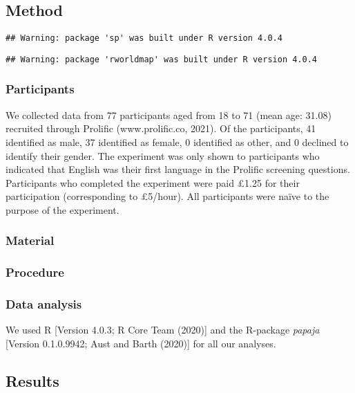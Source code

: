 \documentclass[
  english,
  man]{apa6}
\begin{document}
\hypertarget{method}{%
\subsection{Method}\label{method}}

\begin{verbatim}
## Warning: package 'sp' was built under R version 4.0.4
\end{verbatim}

\begin{verbatim}
## Warning: package 'rworldmap' was built under R version 4.0.4
\end{verbatim}

\hypertarget{participants}{%
\subsubsection{Participants}\label{participants}}

We collected data from 77 participants aged from 18 to 71 (mean age: 31.08) recruited through Prolific (www.prolific.co, 2021). Of the participants, 41 identified as male, 37 identified as female, 0 identified as other, and 0 declined to identify their gender. The experiment was only shown to participants who indicated that English was their first language in the Prolific screening questions. Participants who completed the experiment were paid £1.25 for their participation (corresponding to £5/hour). All participants were naïve to the purpose of the experiment.

\hypertarget{material}{%
\subsubsection{Material}\label{material}}

\hypertarget{procedure}{%
\subsubsection{Procedure}\label{procedure}}

\hypertarget{data-analysis}{%
\subsubsection{Data analysis}\label{data-analysis}}

We used R {[}Version 4.0.3; R Core Team (2020){]} and the R-package \emph{papaja} {[}Version 0.1.0.9942; Aust and Barth (2020){]} for all our analyses.

\hypertarget{results}{%
\subsection{Results}\label{results}}
\end{document}
